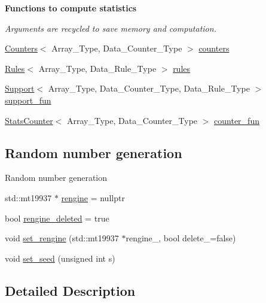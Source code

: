 \begin{Indent}\textbf{ Functions to compute statistics}\par
{\em Arguments are recycled to save memory and computation. }\begin{DoxyCompactItemize}
\item 
\hyperlink{classbarry_1_1_counters}{Counters}$<$ Array\+\_\+\+Type, Data\+\_\+\+Counter\+\_\+\+Type $>$ \hyperlink{classbarry_1_1_model_aea013a7ac325ece7564e8ea9cdf441a2}{counters}
\item 
\hyperlink{classbarry_1_1_rules}{Rules}$<$ Array\+\_\+\+Type, Data\+\_\+\+Rule\+\_\+\+Type $>$ \hyperlink{classbarry_1_1_model_a53e5242ce0ed2bc7194a0662d09493f2}{rules}
\item 
\hyperlink{classbarry_1_1_support}{Support}$<$ Array\+\_\+\+Type, Data\+\_\+\+Counter\+\_\+\+Type, Data\+\_\+\+Rule\+\_\+\+Type $>$ \hyperlink{classbarry_1_1_model_afd005aae0fdd12a8c68d1fd8823b3727}{support\+\_\+fun}
\item 
\hyperlink{classbarry_1_1_stats_counter}{Stats\+Counter}$<$ Array\+\_\+\+Type, Data\+\_\+\+Counter\+\_\+\+Type $>$ \hyperlink{classbarry_1_1_model_ada40ca4ec8b21a3dbbe646edbfb1df45}{counter\+\_\+fun}
\end{DoxyCompactItemize}
\end{Indent}
\subsection*{Random number generation}
\label{_amgrp9e5d9cca94c03e04e66d088f8628d19b}%
Random number generation \begin{DoxyCompactItemize}
\item 
std\+::mt19937 $\ast$ \hyperlink{classbarry_1_1_model_adc85f6765d272293333a83bc2a4e90d2}{rengine} = nullptr
\item 
bool \hyperlink{classbarry_1_1_model_afe239e83969b6b99eddf1ecd509bc8f2}{rengine\+\_\+deleted} = true
\item 
void \hyperlink{classbarry_1_1_model_a1e1cdb67d12968394dbd68dad0cff208}{set\+\_\+rengine} (std\+::mt19937 $\ast$rengine\+\_\+, bool delete\+\_\+=false)
\item 
void \hyperlink{classbarry_1_1_model_a175a1772d843dedd603f6bb572cfa30a}{set\+\_\+seed} (unsigned int s)
\end{DoxyCompactItemize}


\subsection{Detailed Description}
